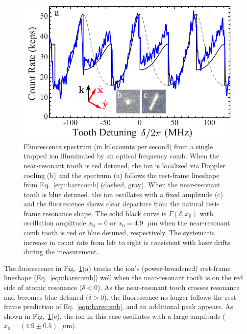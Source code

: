 \documentclass[preprint,superscriptaddress,amsmath,amssymb,aps,prl]{revtex4-1}
\begin{document}
\begin{figure}
\begin{center}
\includegraphics[width=1.0\columnwidth]{Fluorescence_Wide_Comb_Scan_07.pdf}
\end{center}
\caption{Fluorescence spectrum (in kilocounts per second) from a single trapped ion illuminated by an optical frequency comb.  When the near-resonant tooth is red detuned, the ion is localized via Doppler cooling (b) and the spectrum (a) follows the rest-frame lineshape from Eq.~\ref{eqn:barecomb} (dashed, gray).  When the near-resonant tooth is blue detuned, the ion oscillates with a fixed amplitude (c) and the fluorescence shows clear departure from the natural rest-frame resonance shape.  The solid black curve is $\Gamma(\delta,x_0)$ with oscillation amplitude $x_0=0$ or $x_0=4.9\mbox{ }\mu\mbox{m}$ when the near-resonant comb tooth is red or blue detuned, respectively.  The systematic increase in count rate from left to right is consistent with laser drifts during the measurement.}
\label{fig:WideCombScan}
\end{figure}

The fluorescence in Fig.~\ref{fig:WideCombScan}(a) tracks the ion's (power-broadened) rest-frame lineshape (Eq.~\ref{eqn:barecomb}) well when the near-resonant tooth is on the red side of atomic resonance ($\delta < 0$). As the near-resonant tooth crosses resonance and becomes blue-detuned ($\delta>0$), the fluorescence no longer follows the rest-frame prediction of Eq.~\ref{eqn:barecomb}, and an additional peak appears. As shown in Fig.~\ref{fig:WideCombScan}(c), the ion in this case oscillates with a large amplitude ($x_0=(4.9 \pm 0.5) \mbox{ }\mu\mbox{m}$).
\end{document}
